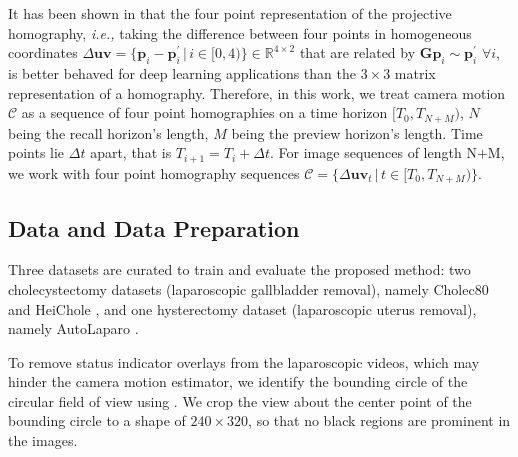 It has been shown in \cite{DeTone2016DeepEstimation} that the four point representation of the projective homography, \emph{i.e.,}  taking the difference between four points in homogeneous coordinates $\Delta\mathbf{uv} = \{\mathbf{p}_i - \mathbf{p}^\prime_i\,|\,i \in [0, 4)\} \in \mathbb{R}^{4\times2}$ that are related by $\mathbf{G}\mathbf{p}_i \sim \mathbf{p}^\prime_i\,\,\forall i$, is better behaved for deep learning applications than the $3\times3$ matrix representation of a homography.
%
Therefore, in this work, we treat camera motion $\mathcal{C}$ as a sequence of four point homographies on a time horizon $[T_0, T_{N+M})$, $N$ being the recall horizon's length, $M$ being the preview horizon's length. Time points 
lie $\Delta t$ apart, that is $T_{i+1} = T_{i} + \Delta t$. For image sequences of length $\text{N+M}$,
we work with
four point homography sequences $\mathcal{C}=\{\Delta\mathbf{uv}_t \,|\, t\in[T_0, T_{N+M})\}$.



\subsection{Data and Data Preparation}
\label{c3:sec:data_and_data_preparation}
Three datasets are
curated
to train and evaluate the proposed method: two cholecystectomy datasets (laparoscopic gallbladder removal), namely Cholec80 \cite{twinanda2016endonet} and HeiChole \cite{wagner2023comparative}, and one hysterectomy dataset (laparoscopic uterus removal), namely AutoLaparo \cite{wang2022autolaparo}.


To remove status indicator overlays from the laparoscopic videos, which may hinder the camera motion estimator, we identify the bounding circle of the circular field of view using \cite{Budd2022RapidDataset}. We crop the view about the center point of the bounding circle to a shape of $240\times320$, so that no black regions are prominent in the images.


